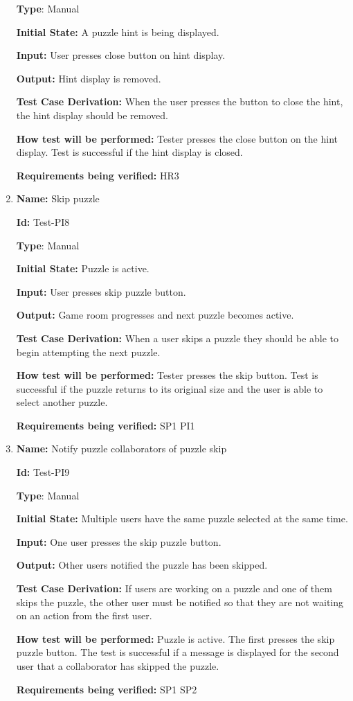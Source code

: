 \documentclass[12pt, titlepage]{article}
\begin{document}
\begin{enumerate}
\textbf{Type}: Manual

\textbf{Initial State:} A puzzle hint is being displayed.

\textbf{Input:} User presses close button on hint display.

\textbf{Output:} Hint display is removed.

\textbf{Test Case Derivation:}
When the user presses the button to close the hint, the hint display should be removed.

\textbf{How test will be performed:}
Tester presses the close button on the hint display. Test is successful if the hint display is closed.

\textbf{Requirements being verified: } HR3

\item{\textbf{Name:} Skip puzzle} \label{itm:Test-PI10}

\textbf{Id:} Test-PI8

\textbf{Type}: Manual

\textbf{Initial State:} Puzzle is active.

\textbf{Input:} User presses skip puzzle button.

\textbf{Output:} Game room progresses and next puzzle becomes active.

\textbf{Test Case Derivation:}
When a user skips a puzzle they should be able to begin attempting the next puzzle.

\textbf{How test will be performed:}
Tester presses the skip button. Test is successful if the puzzle returns to its original size and the user is able to select another puzzle.

\textbf{Requirements being verified: } SP1 PI1

\item{\textbf{Name:} Notify puzzle collaborators of puzzle skip} \label{itm:Test-PI13}

\textbf{Id:} Test-PI9

\textbf{Type}: Manual

\textbf{Initial State:} Multiple users have the same puzzle selected at the same time.

\textbf{Input:} One user presses the skip puzzle button.

\textbf{Output:} Other users notified the puzzle has been skipped.

\textbf{Test Case Derivation:}
If users are working on a puzzle and one of them skips the puzzle, the other user must be notified so that they are not waiting on an action from the first user.

\textbf{How test will be performed:}
Puzzle is active. The first presses the skip puzzle button. The test is successful if a message is displayed for the second user that a collaborator has skipped the puzzle.

\textbf{Requirements being verified: } SP1 SP2

\end{enumerate}
\end{document}

